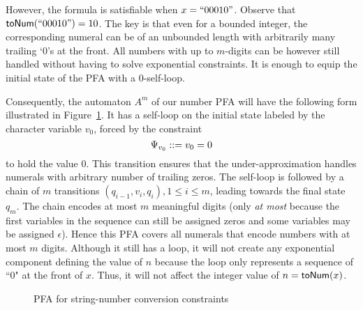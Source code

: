 \documentclass[sigplan,review,anonymous]{acmart}\settopmatter{printfolios=true,printccs=false,printacmref=false}
\begin{document}
However, the formula is satisfiable when $x=``00010"$. Observe that $\mbox{\textsf{toNum}($``00010"$)}=10$. The key is that even for a bounded integer, the corresponding numeral can be of an unbounded length with arbitrarily many trailing `$0$'s at the front. All numbers with up to $m$-digits can be however still handled without having to solve exponential constraints. It is enough to equip the initial state of the PFA with a  $0$-self-loop.

Consequently, the automaton $A^m$ of our number PFA will have the following form illustrated in Figure~\ref{fig:sfa_its}. 
It has a self-loop on the initial state labeled by the character variable $v_0$, 
forced by the constraint 
$$
\Psi_{v_0}::= v_0=0
$$ 
to hold the value $0$. 
This transition ensures that the under-approximation handles numerals with arbitrary number of trailing zeros.  
The self-loop is followed by a chain of $m$ transitions $(q_{i-1},v_i,q_{i}),1\leq i \leq m$, leading towards the final state $q_m$. 
The chain encodes at most $m$ meaningful digits (only \emph{at most} because the first variables in the sequence can still be assigned zeros and some variables may be assigned $\epsilon$). Hence this PFA covers all numerals that encode numbers with at most $m$ digits.
Although it still has a loop, it will not create any exponential component defining the value of $n$ because the loop only represents a sequence of ``0" at the front of $x$. Thus, it will not affect the integer value of $n=\mbox{\textsf{toNum}($x$)}$.

\begin{figure}
	
	\caption{PFA for string-number conversion constraints}
	\label{fig:sfa_its}
\end{figure}
\end{document}
